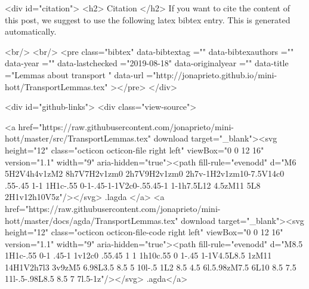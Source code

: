 {{  
  <div id="citation">
  <h2> Citation </h2>
  If you want to cite the content of this post,
  we suggest to use the following latex bibtex entry.
  This is generated automatically.

  <br/>
  <br/>
  <pre class="bibtex"
       data-bibtextag =""
       data-bibtexauthors =""
       data-year =""
       data-lastchecked ="2019-08-18"
       data-originalyear =""
       data-title ="Lemmas about transport "
       data-url ="http://jonaprieto.github.io/mini-hott/TransportLemmas.tex"
  ></pre>
  </div>
  

  <div id="github-links">
    <div class="view-source">
      
        <a href="https://raw.githubusercontent.com/jonaprieto/mini-hott/master/src/TransportLemmas.tex" download target="_blank"><svg height="12" class="octicon octicon-file right left" viewBox="0 0 12 16" version="1.1" width="9" aria-hidden="true"><path fill-rule="evenodd" d="M6 5H2V4h4v1zM2 8h7V7H2v1zm0 2h7V9H2v1zm0 2h7v-1H2v1zm10-7.5V14c0 .55-.45 1-1 1H1c-.55 0-1-.45-1-1V2c0-.55.45-1 1-1h7.5L12 4.5zM11 5L8 2H1v12h10V5z"/></svg> .lagda </a>
        <a href="https://raw.githubusercontent.com/jonaprieto/mini-hott/master/docs/agda/TransportLemmas.tex" download target="_blank"><svg height="12" class="octicon octicon-file-code right left" viewBox="0 0 12 16" version="1.1" width="9" aria-hidden="true"><path fill-rule="evenodd" d="M8.5 1H1c-.55 0-1 .45-1 1v12c0 .55.45 1 1 1h10c.55 0 1-.45 1-1V4.5L8.5 1zM11 14H1V2h7l3 3v9zM5 6.98L3.5 8.5 5 10l-.5 1L2 8.5 4.5 6l.5.98zM7.5 6L10 8.5 7.5 11l-.5-.98L8.5 8.5 7 7l.5-1z"/></svg> .agda</a>
      
}}
